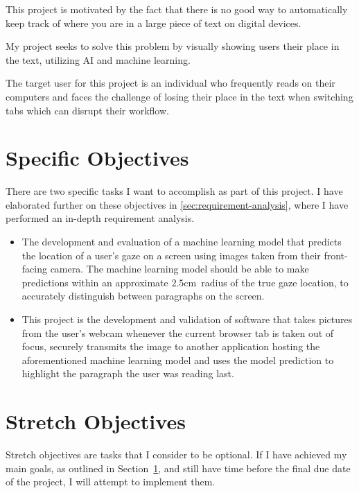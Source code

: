 \documentclass{report}
\begin{document}
This project is motivated by the fact that there is no good way to automatically keep track of where you are in a large piece of text on digital devices.

My project seeks to solve this problem by visually showing users their place in the text, utilizing AI and machine learning.

The target user for this project is an individual who frequently reads on their computers and faces the challenge of losing their place in the text when switching tabs which can disrupt their workflow.

\section{Specific Objectives}\label{sec:specific-objectives}

There are two specific tasks I want to accomplish as part of this project. I have elaborated further on these objectives in \autoref{sec:requirement-analysis}, where I have performed an in-depth requirement analysis. 

\begin{itemize}
    \item The development and evaluation of a machine learning model that predicts the location of a user's gaze on a screen using images taken from their front-facing camera. The machine learning model should be able to make predictions within an approximate \(2.5\text{cm}\)~radius of the true gaze location, to accurately distinguish between paragraphs on the screen.
    \item This project is the development and validation of software that takes pictures from the user's webcam whenever the current browser tab is taken out of focus, securely transmits the image to another application hosting the aforementioned machine learning model and uses the model prediction to highlight the paragraph the user was reading last.
\end{itemize}

\section{Stretch Objectives}\label{sec:stretch-objectives}

Stretch objectives are tasks that I consider to be optional. If I have achieved my main goals, as outlined in Section~\ref{sec:specific-objectives}, and still have time before the final due date of the project, I will attempt to implement them.
\end{document}
